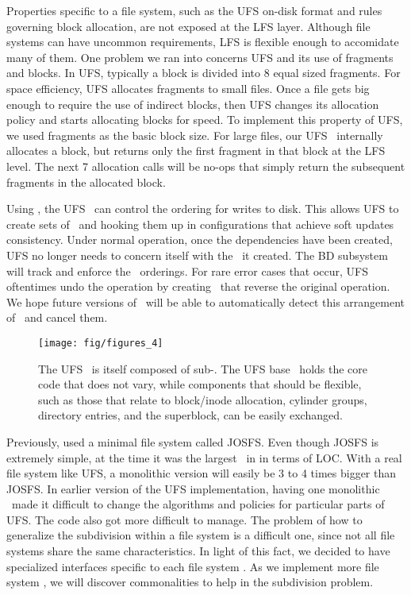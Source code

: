 Properties specific to a file system, such as the UFS on-disk format and rules
governing block allocation, are not exposed at the LFS layer. Although file
systems can have uncommon requirements, LFS is flexible enough to accomidate
many of them. One problem we ran into concerns UFS and its use of fragments
and blocks. In UFS, typically a block is divided into 8 equal sized fragments.
For space efficiency, UFS allocates fragments to small files. Once a file gets
big enough to require the use of indirect blocks, then UFS changes its
allocation policy and starts allocating blocks for speed. To implement this
property of UFS, we used fragments as the basic block size. For large files,
our UFS \module\ internally allocates a block, but returns only the first
fragment in that block at the LFS level. The next 7 allocation calls will be
no-ops that simply return the subsequent fragments in the allocated block.

Using \chdescs, the UFS \module\ can control the ordering for writes to disk.
This allows UFS to create sets of \chdescs\ and hooking them up in
configurations that achieve soft updates consistency. Under normal operation,
once the dependencies have been created, UFS no longer needs to concern itself
with the \chdescs\ it created. The BD subsystem will track and enforce the
\chdesc\ orderings. For rare error cases that occur, UFS oftentimes
undo the operation by creating \chdescs\ that reverse the original operation.
We hope future versions of \Kudos\ will be able to automatically detect this
arrangement of \chdescs\ and cancel them.

\begin{figure}[tb]
  \centering
  \texttt{[image: fig/figures\_4]}
  \caption{\label{fig:ufsmodules} The UFS \module\ is itself composed of
  sub-\modules. The UFS base \module\ holds the core code that does not vary,
  while components that should be flexible, such as those that relate to
  block/inode allocation, cylinder groups, directory entries, and the
  superblock, can be easily exchanged.}
\end{figure}

Previously, \Kudos used a minimal file system called JOSFS. Even though JOSFS
is extremely simple, at the time it was the largest \module\ in \Kudos in terms
of LOC. With a real file system like UFS, a monolithic version will easily be
3 to 4 times bigger than JOSFS. In earlier version of the \Kudos UFS
implementation, having one monolithic \module\ made it difficult to change the
algorithms and policies for particular parts of UFS. The code also got more
difficult to manage. The problem of how to generalize the subdivision within
a file system is a difficult one, since not all file systems share the same
characteristics. In light of this fact, we decided to have specialized
interfaces specific to each file system \module. As we implement more file
system \modules, we will discover commonalities to help in the subdivision
problem.

